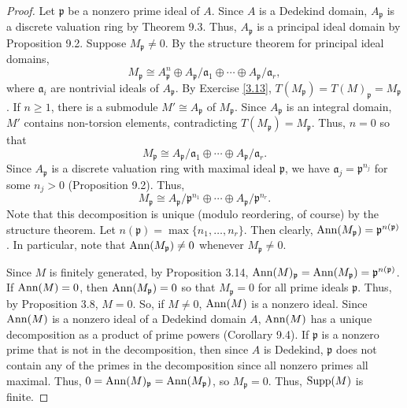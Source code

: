 \begin{proof}
Let $\mathfrak{p}$ be a nonzero prime ideal of $A$. Since $A$ is a Dedekind domain, $A_{\mathfrak{p}}$ is a discrete valuation ring by Theorem 9.3. Thus, $A_{\mathfrak{p}}$
is a principal ideal domain by Proposition 9.2. Suppose $M_{\mathfrak{p}} \neq 0$. By the structure theorem for principal ideal domains,
$$M_{\mathfrak{p}} \cong A_{\mathfrak{p}}^n \oplus A_{\mathfrak{p}}/\mathfrak{a}_1 \oplus \cdots \oplus A_{\mathfrak{p}}/\mathfrak{a}_r,$$
where $\mathfrak{a}_i$ are nontrivial ideals of $A_{\mathfrak{p}}$. By Exercise \ref{3.13}, $T(M_{\mathfrak{p}}) = T(M)_{\mathfrak{p}} = M_{\mathfrak{p}}$. If $n \ge 1$, there
is a submodule $M' \cong A_{\mathfrak{p}}$ of $M_{\mathfrak{p}}$. Since $A_{\mathfrak{p}}$ is an integral domain, $M'$ contains non-torsion elements, contradicting $T(M_{\mathfrak{p}}) = M_{\mathfrak{p}}$.
Thus, $n = 0$ so that
$$M_{\mathfrak{p}} \cong A_{\mathfrak{p}}/\mathfrak{a}_1 \oplus \cdots \oplus A_{\mathfrak{p}}/\mathfrak{a}_r.$$
Since $A_{\mathfrak{p}}$ is a discrete valuation ring with maximal ideal $\mathfrak{p}$, we have $\mathfrak{a}_j = \mathfrak{p}^{n_j}$ for some $n_j > 0$ (Proposition 9.2). Thus,
$$M_{\mathfrak{p}} \cong A_{\mathfrak{p}}/\mathfrak{p}^{n_1} \oplus \cdots \oplus A_{\mathfrak{p}}/\mathfrak{p}^{n_r}.$$
Note that this decomposition is unique (modulo reordering, of course) by the structure theorem. Let $n(\mathfrak{p}) = \max\{n_1,\ldots,n_r\}$. Then clearly, 
$\operatorname{Ann}(M_{\mathfrak{p}}) = \mathfrak{p}^{n(\mathfrak{p})}$. In particular, note that $\operatorname{Ann}(M_{\mathfrak{p}}) \neq 0$ whenever $M_{\mathfrak{p}} \neq 0$.

Since $M$ is finitely generated, by Proposition 3.14, $\operatorname{Ann}(M)_{\mathfrak{p}} = \operatorname{Ann}(M_{\mathfrak{p}}) = \mathfrak{p}^{n(\mathfrak{p})}$. If $\operatorname{Ann}(M) = 0$, then
$\operatorname{Ann}(M_{\mathfrak{p}}) = 0$ so that $M_{\mathfrak{p}} = 0$ for all prime ideals $\mathfrak{p}$. Thus, by Proposition 3.8, $M = 0$. So, if $M \neq 0$, $\operatorname{Ann}(M)$
is a nonzero ideal. Since $\operatorname{Ann}(M)$ is a nonzero ideal of a Dedekind domain $A$, $\operatorname{Ann}(M)$ has a unique decomposition as a product of prime powers (Corollary 9.4). If
$\mathfrak{p}$ is a nonzero prime that is not in the decomposition, then since $A$ is Dedekind, $\mathfrak{p}$ does not contain any of the primes in the decomposition since
all nonzero primes all maximal. Thus, $0 = \operatorname{Ann}(M)_{\mathfrak{p}} = \operatorname{Ann}(M_{\mathfrak{p}})$, so $M_{\mathfrak{p}} = 0$. Thus, $\operatorname{Supp}(M)$ is finite.


\end{proof}
